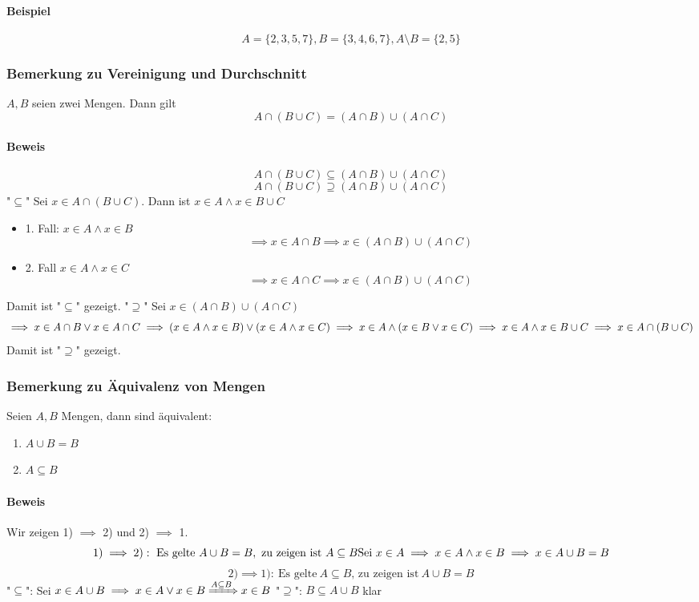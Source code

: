 \documentclass[a4paper]{scrartcl}
\theoremstyle{definition}
\theoremstyle{plain}
\theoremstyle{plain}
\theoremstyle{remark}
\theoremstyle{remark}
\theoremstyle{remark}
\theoremstyle{remark}
\theoremstyle{remark}
\begin{document}
\paragraph{Beispiel}
\label{sec-2-4-8-1}
\[A=\{2,3,5,7\}, B=\{3,4,6,7\}, A\setminus B = \{2,5\}\]
\subsubsection{Bemerkung zu Vereinigung und Durchschnitt}
\label{sec-2-4-9}
$A,B$ seien zwei Mengen. Dann gilt \[A\cap (B\cup C) = (A\cap B) \cup (A\cap C)\]
\paragraph{Beweis}
\label{sec-2-4-9-1}
\[A\cap(B\cup C) \subseteq (A\cap B) \cup (A\cap C)\]
\[A\cap(B\cup C) \supseteq (A\cap B) \cup (A\cap C)\]
"$\subseteq$" Sei $x\in A \cap (B\cup C)$. Dann ist $x\in A \wedge x\in B\cup C$
\begin{itemize}
\item 1. Fall: $x\in A \wedge x\in B$
           \[\implies x\in A\cap B \implies x \in (A\cap B) \cup (A\cap C)\]
\item 2. Fall $x\in A \wedge x\in C$
           \[\implies x\in A\cap C \implies x\in (A\cap B)\cup(A\cap C)\]
\end{itemize}
Damit ist "$\subseteq$" gezeigt.
"$\supseteq$" Sei $x\in (A\cap B) \cup (A\cap C)$
\[\implies x\in A\cap B \vee x\in A\cap C \\ \implies (x\in A \wedge x\in B) \vee (x\in A \wedge x\in C) \\ \implies x\in A \wedge (x\in B\vee x\in C) \\ \implies x\in A \wedge x\in B\cup C \\ \implies x\in A\cap (B\cup C)\]
Damit ist "$\supseteq$" gezeigt.
\subsubsection{Bemerkung zu Äquivalenz von Mengen}
\label{sec-2-4-10}
Seien $A,B$ Mengen, dann sind äquivalent:
\begin{enumerate}
\item $A\cup B = B$
\item $A\subseteq B$
\end{enumerate}
\paragraph{Beweis}
\label{sec-2-4-10-1}
Wir zeigen 1) $\implies$ 2) und 2) $\implies$ 1.
\[1) \implies 2):~\text{Es gelte}~A\cup B = B,~\text{zu zeigen ist}~A\subseteq B \\ \text{Sei}~x\in A \implies x\in A \wedge x \in B \implies x\in A\cup B = B\]
\[2) \implies 1):~\text{Es gelte}~A\subseteq B\text{, zu zeigen ist}~A\cup B = B \]
"$\subseteq$": Sei $x\in A\cup B \implies x\in A \vee x\in B \xRightarrow{A\subseteq B} x\in B$
"$\supseteq$": $B\subseteq A\cup B$ klar
\end{document}
